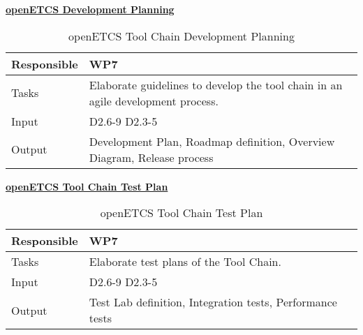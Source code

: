 \documentclass{template/openetcs_article}
\begin{document}
\underline{\textbf{openETCS Development Planning}}
\begin{table}[H]
	\begin{center}
		\begin{supertabular}[H]{|p{6cm}|p{8cm}|}
			\hline

			Responsible &
			WP7 \\
			\hline

			Tasks &
			
			Elaborate guidelines to develop the tool chain in an agile development process.
			\\
			\hline

			Input &
			D2.6-9
			D2.3-5\\
			\hline
			
			Output &
			
			Development Plan,
			Roadmap definition,
			Overview Diagram,
			Release process\\
			\hline
	
		\end{supertabular}
	\end{center}
	\caption{openETCS Tool Chain Development Planning}
\end{table}
\underline{\textbf{openETCS Tool Chain Test Plan}}
\begin{table}[H]
	\begin{center}
		\begin{supertabular}[H]{|p{6cm}|p{8cm}|}
			\hline

			Responsible &
			WP7 \\
			\hline

			Tasks &
			
			Elaborate test plans of the Tool Chain.\\
			\hline
			
			Input &
			D2.6-9
			D2.3-5\\
			\hline
			
			Output &
			
			Test Lab definition, Integration tests, Performance tests\\
			\hline
			
		\end{supertabular}
	\end{center}
	\caption{openETCS Tool Chain Test Plan}
\end{table}
\end{document}
